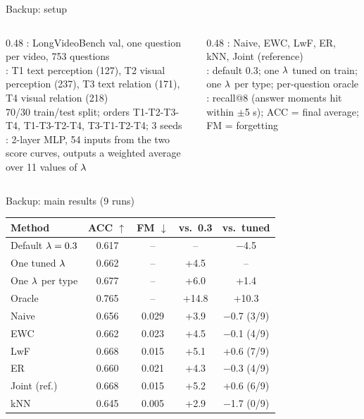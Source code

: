 \documentclass[aspectratio=169,11pt]{beamer}
\begin{document}
\begin{frame}{Backup: setup}
  \small
  \begin{columns}[T,onlytextwidth]
    \begin{column}{0.48\textwidth}
      : LongVideoBench val, one question per video, 753 questions\\[1mm]
      : T1 text perception (127), T2 visual perception (237), T3 text relation (171), T4 visual relation (218)\\[1mm]
      70/30 train/test split; orders T1-T2-T3-T4, T1-T3-T2-T4, T3-T1-T2-T4; 3 seeds\\[1mm]
      : 2-layer MLP, 54 inputs from the two score curves, outputs a weighted average over 11 values of $\lambda$
    \end{column}
    \begin{column}{0.48\textwidth}
      : Naive, EWC, LwF, ER, kNN, Joint (reference)\\[1mm]
      : default 0.3; one $\lambda$ tuned on train; one $\lambda$ per type; per-question oracle\\[1mm]
      : recall@8 (answer moments hit within $\pm$5 s); ACC = final average; FM = forgetting
    \end{column}
  \end{columns}
\end{frame}

\begin{frame}{Backup: main results (9 runs)}
  \centering\small
  \begin{tabular}{lcccc}
    \toprule
    Method & ACC $\uparrow$ & FM $\downarrow$ & vs.\ 0.3 & vs.\ tuned \\
    \midrule
    Default $\lambda=0.3$ & 0.617 & -- & -- & $-$4.5 \\
    One tuned $\lambda$ & 0.662 & -- & +4.5 & -- \\
    One $\lambda$ per type & 0.677 & -- & +6.0 & +1.4 \\
    Oracle & 0.765 & -- & +14.8 & +10.3 \\
    \midrule
    Naive & 0.656 & 0.029 & +3.9 & $-$0.7 (3/9) \\
    EWC & 0.662 & 0.023 & +4.5 & $-$0.1 (4/9) \\
    LwF & 0.668 & 0.015 & +5.1 & +0.6 (7/9) \\
    ER & 0.660 & 0.021 & +4.3 & $-$0.3 (4/9) \\
    Joint (ref.) & 0.668 & 0.015 & +5.2 & +0.6 (6/9) \\
    kNN & 0.645 & 0.005 & +2.9 & $-$1.7 (0/9) \\
    \bottomrule
  \end{tabular}
\end{frame}
\end{document}
